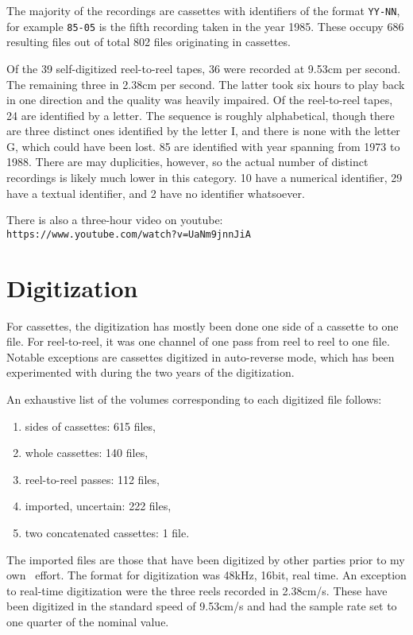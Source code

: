 \documentclass{llncs}
\begin{document}
The majority of the recordings are cassettes with
identifiers of the format \texttt{YY-NN}, for example \texttt{85-05} is the fifth recording taken in the year 1985. These occupy 686 resulting files out of total 802 files originating in cassettes.

Of the 39 self-digitized reel-to-reel tapes, 36 were recorded at 9.53cm per
second. The remaining three in 2.38cm per second. The latter took six hours to
play back in one direction and the quality was heavily impaired. Of the
reel-to-reel tapes, 24 are identified by a letter. The sequence
is roughly alphabetical, though there
are three distinct ones identified by the letter I, and there is none with the
letter G, which could have been lost. 85 are identified with year spanning from
1973 to 1988. There are may duplicities, however, so the actual number of
distinct recordings is likely much lower in this category. 10 have a numerical
identifier, 29 have a textual identifier, and 2 have no identifier whatsoever.

There is also a three-hour video on youtube: \\
\texttt{https://www.youtube.com/watch?v=UaNm9jnnJiA}

\section{Digitization}

For cassettes, the digitization has mostly been done one side of a cassette to
one file. For reel-to-reel, it was one channel of one pass from reel to reel to one file. Notable exceptions are cassettes digitized in auto-reverse mode, which has been experimented with during the two years of the digitization. 

An exhaustive list of the volumes corresponding to each digitized file follows:
\begin{enumerate}
    \item{sides of cassettes: 615 files,}
    \item{whole cassettes: 140 files,}
    \item{reel-to-reel passes: 112 files,}
    \item{imported, uncertain: 222 files,}
    \item{two concatenated cassettes: 1 file.}
\end{enumerate}

The imported files are those that have been digitized by other parties prior to my own  effort. The format for digitization was 48kHz, 16bit, real time. An exception to real-time digitization were the three reels recorded in 2.38cm/s. These have been digitized in the standard speed of 9.53cm/s and had the sample rate set to one quarter of the nominal value.
\end{document}
